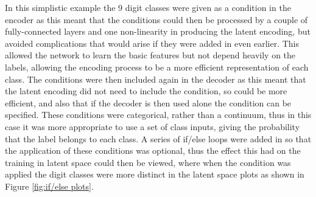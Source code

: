 \documentclass[fleqn,usenatbib]{mnras}
\begin{document}
In this simplistic example the 9 digit classes were given as a condition in the encoder as this meant that the conditions could then be processed by a couple of fully-connected layers and one non-linearity in producing the latent encoding, but avoided complications that would arise if they were added in even earlier. This allowed the network to learn the basic features but not depend heavily on the labels, allowing the encoding process to be a more efficient representation of each class. The conditions were then included again in the decoder as this meant that the latent encoding did not need to include the condition, so could be more efficient, and also that if the decoder is then used alone the condition can be specified. These conditions were categorical, rather than a continuum, thus in this case it was more appropriate to use a set of class inputs, giving the probability that the label belongs to each class. A series of if/else loops were added in so that the application of these conditions was optional, thus the effect this had on the training in latent space could then be viewed, where when the condition was applied the digit classes were more distinct in the latent space plots as shown in Figure \ref{fig:if/else plots}.
\end{document}
